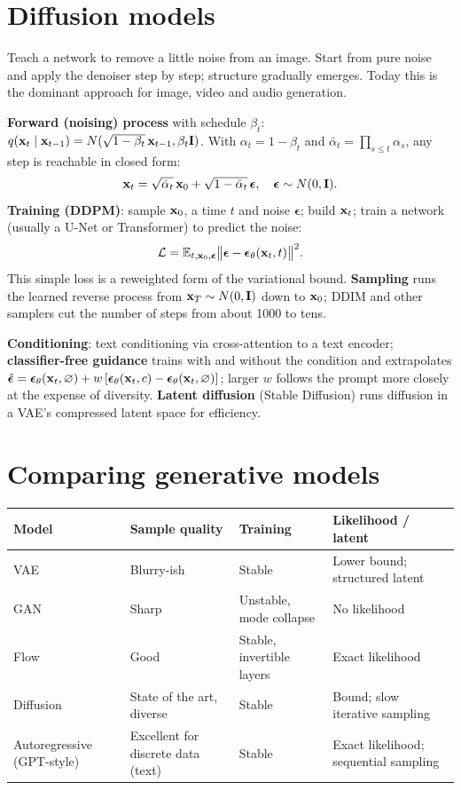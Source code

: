 \section{Diffusion models}
\begin{intuition}
Teach a network to remove a little noise from an image. Start from pure noise and apply the denoiser step by step; structure gradually emerges. Today this is the dominant approach for image, video and audio generation.
\end{intuition}
\textbf{Forward (noising) process} with schedule $\beta_t$: $q(\mathbf{x}_t\mid\mathbf{x}_{t-1})=N(\sqrt{1-\beta_t}\,\mathbf{x}_{t-1},\beta_t\mathbf{I})$. With $\alpha_t=1-\beta_t$ and $\bar\alpha_t=\prod_{s\le t}\alpha_s$, any step is reachable in closed form:
\[\mathbf{x}_t=\sqrt{\bar\alpha_t}\,\mathbf{x}_0+\sqrt{1-\bar\alpha_t}\,\bm\epsilon,\quad\bm\epsilon\sim N(0,\mathbf{I}).\]
\textbf{Training (DDPM)}: sample $\mathbf{x}_0$, a time $t$ and noise $\bm\epsilon$; build $\mathbf{x}_t$; train a network (usually a U-Net or Transformer) to predict the noise:
\[\mathcal{L}=\mathbb{E}_{t,\mathbf{x}_0,\bm\epsilon}\big\|\bm\epsilon-\bm\epsilon_\theta(\mathbf{x}_t,t)\big\|^2.\]
This simple loss is a reweighted form of the variational bound. \textbf{Sampling} runs the learned reverse process from $\mathbf{x}_T\sim N(0,\mathbf{I})$ down to $\mathbf{x}_0$; DDIM and other samplers cut the number of steps from about 1000 to tens.

\textbf{Conditioning}: text conditioning via cross-attention to a text encoder; \textbf{classifier-free guidance} trains with and without the condition and extrapolates $\hat{\bm\epsilon}=\bm\epsilon_\theta(\mathbf{x}_t,\varnothing)+w\,[\bm\epsilon_\theta(\mathbf{x}_t,c)-\bm\epsilon_\theta(\mathbf{x}_t,\varnothing)]$; larger $w$ follows the prompt more closely at the expense of diversity. \textbf{Latent diffusion} (Stable Diffusion) runs diffusion in a VAE's compressed latent space for efficiency.

\section{Comparing generative models}
\begin{tabular}{@{}p{}p{}p{}p{}@{}}
\toprule
Model & Sample quality & Training & Likelihood / latent\\
\midrule
VAE & Blurry-ish & Stable & Lower bound; structured latent\\
GAN & Sharp & Unstable, mode collapse & No likelihood\\
Flow & Good & Stable, invertible layers & Exact likelihood\\
Diffusion & State of the art, diverse & Stable & Bound; slow iterative sampling\\
Autoregressive (GPT-style) & Excellent for discrete data (text) & Stable & Exact likelihood; sequential sampling\\
\bottomrule
\end{tabular}

